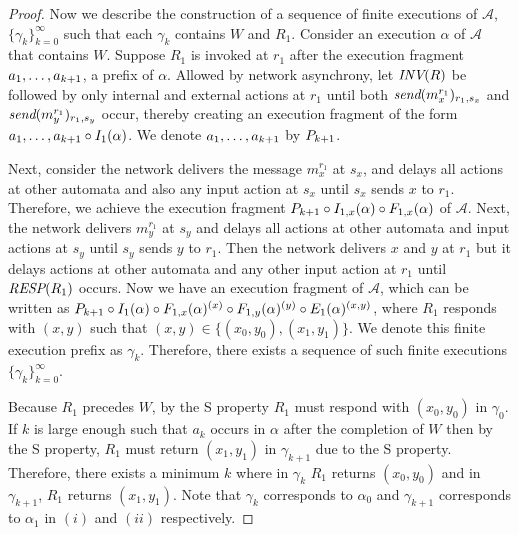 \begin{proof}
Now we describe the construction of a sequence  of finite executions of $\mathcal{A}$, $\{\gamma_k\}_{k=0}^{\infty}$  such that each $\gamma_k$ contains $W$ and $R_1$.
Consider an execution $\alpha$ of $\mathcal{A}$ that contains $W$. 
Suppose $R_1$ is invoked at $r_1$ after the execution fragment 
$\finiteprefixt{k}{k+1}$,  a
prefix of $\alpha$. Allowed by network asynchrony, let $\INV{R}$ be followed by only internal and external actions at $r_1$ until both
 $\send{m_x^{r_1}}{ r_1, s_x}$ and $\send{m_y^{r_1}}{ r_1, s_y}$ occur, thereby creating an execution fragment of the form
$\finiteprefixt{k}{k+1}\circ I_1(\alpha)$. We denote $\finiteprefixt{k}{k+1}$ by $\finiteprefixA{k}{k+1}$.

Next, consider the network delivers the message $m_x^{r_1}$ at $s_x$, and delays 
all actions at other automata and also any  input action at $s_x$ until $s_x$ sends $x$ to $r_1$. Therefore, we achieve the execution fragment   
$\finiteprefixA{k}{k+1}\circ \frage{ I_{1,x}}{\alpha}{} \circ \frage{F_{1,x}}{\alpha}{}$  of  ${\mathcal A}$. 
Next, the network delivers $m_y^{r_1}$ at $s_y$ and delays all actions at other automata and input actions at $s_y$ until $s_y$ sends $y$ to $r_1$. 
Then the network delivers $x$ and $y$ at $r_1$ but it delays  actions at other automata and any other input action at $r_1$ until $\RESP{R_1}$ occurs. Now we have an execution fragment of $\mathcal{A}$, which can be written as 
 $\finiteprefixA{k}{k+1}\circ \frage{I_1}{\alpha}{} \circ \frage{F_{1,x}}{\alpha}{x} \circ \frage{F_{1,y}}{\alpha}{y} \circ \frage{E_1}{\alpha}{x,y}$, where $R_1$ responds with $(x, y)$ such that $(x, y) \in \{ (x_0, y_0), (x_1, y_1) \}$.  We denote this finite execution prefix as $\gamma_k$. Therefore, there exists a sequence of such finite executions  
 $\{\gamma_k\}_{k=0}^{\infty}$.

Because $R_1$ precedes  $W$, by the S property $R_1$ must respond with $(x_0, y_0)$ in $\gamma_0$. If $k$ is large enough such that $a_{k}$ occurs in $\alpha$ after the completion of $W$ then by  the S property,  $R_1$ must return  $(x_1, y_1)$ in 
$\gamma_{k+1}$ due to the S property.  Therefore, there exists a minimum $k$  where in $\gamma_k$
\rot{} $R_1$ returns  $(x_0, y_0)$ and 
 in $\gamma_{k+1}$,
$R_1$ returns  $(x_1, y_1)$. 
Note that $\gamma_{k}$ corresponds to $\alpha_0$ and $\gamma_{k+1}$ corresponds to $\alpha_1$ in $(i)$ and $(ii)$ respectively. 


\end{proof}
